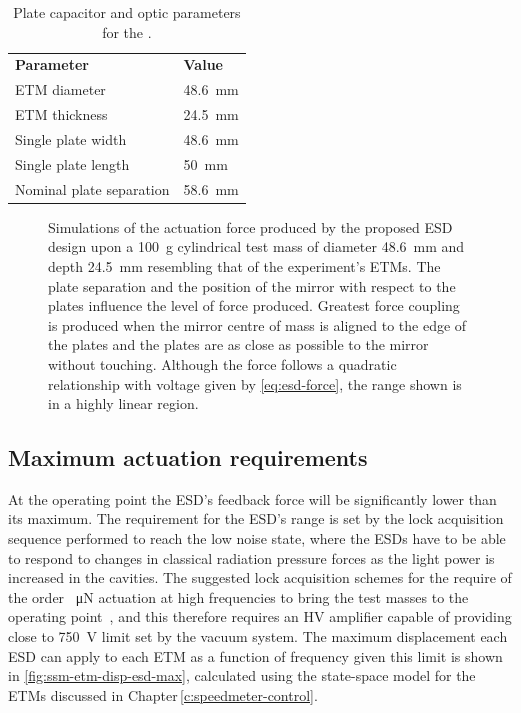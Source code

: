 \begin{table}
  \centering
  \begin{tabular}{ll}
    \textbf{Parameter}   & \textbf{Value} \\
    \gls{ETM} diameter      & \SI{48.6}{\milli\meter} \\
    \gls{ETM} thickness     & \SI{24.5}{\milli\meter} \\
    Single plate width   & \SI{48.6}{\milli\meter} \\
    Single plate length  & \SI{50}{\milli\meter} \\
    Nominal plate separation & \SI{58.6}{\milli\meter} \\
  \end{tabular}
  \caption[Plate capacitor and optic parameters for the \SSMEXPT{}]{\label{tab:ssm-esd-parameters}Plate capacitor and optic parameters for the \SSMEXPT{}.}
\end{table}

\begin{figure}
  \centering
  
  \caption[Simulations of the actuation force produced by the proposed electrostatic drive design]{\label{fig:ssm-esd-ansys}Simulations of the actuation force produced by the proposed \gls{ESD} design upon a \SI{100}{\gram} cylindrical test mass of diameter \SI{48.6}{\milli\meter} and depth \SI{24.5}{\milli\meter} resembling that of the \SSM{} experiment's \glspl{ETM}. The plate separation and the position of the mirror with respect to the plates influence the level of force produced. Greatest force coupling is produced when the mirror centre of mass is aligned to the edge of the plates and the plates are as close as possible to the mirror without touching. Although the force follows a quadratic relationship with voltage given by \cref{eq:esd-force}, the range shown is in a highly linear region.}
\end{figure}

\subsection{Maximum actuation requirements}
At the operating point the \gls{ESD}'s feedback force will be significantly lower than its maximum. The requirement for the \gls{ESD}'s range is set by the lock acquisition sequence performed to reach the low noise state, where the \glspl{ESD} have to be able to respond to changes in classical radiation pressure forces as the light power is increased in the cavities. The suggested lock acquisition schemes for the \SSMEXPT{} require of the order \SI{}{\micro\newton} actuation at high frequencies to bring the test masses to the operating point~\cite{Glaefke2015}, and this therefore requires an \gls{HV} amplifier capable of providing close to \SI{750}{\volt} limit set by the vacuum system. The maximum displacement each \gls{ESD} can apply to each \gls{ETM} as a function of frequency given this limit is shown in \cref{fig:ssm-etm-disp-esd-max}, calculated using the state-space model for the \glspl{ETM} discussed in Chapter\,\ref{c:speedmeter-control}.

